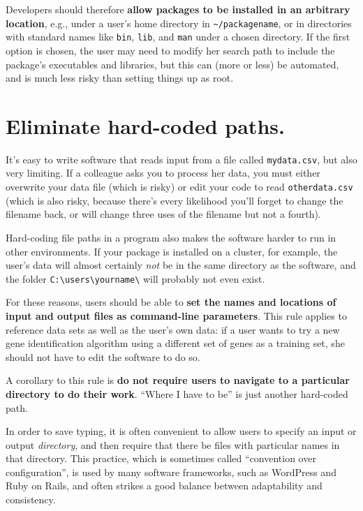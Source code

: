 \documentclass[10pt,letterpaper]{article}
\begin{document}
Developers should therefore
\textbf{allow packages to be installed in an arbitrary location},
e.g., under a user's home directory in
\texttt{\textasciitilde{}/packagename}, or in directories with standard
names like \texttt{bin}, \texttt{lib}, and \texttt{man} under a chosen
directory. If the first option is chosen, the user may need to modify
her search path to include the package's executables and libraries, but
this can (more or less) be automated, and is much less risky than
setting things up as root.

\section{Eliminate hard-coded paths.}

It's easy to write software that reads input from a file called
\texttt{mydata.csv}, but also very limiting. If a colleague asks you to
process her data, you must either overwrite your data file (which is
risky) or edit your code to read \texttt{otherdata.csv} (which is also
risky, because there's every likelihood you'll forget to change the
filename back, or will change three uses of the filename but not a
fourth).

Hard-coding file paths in a program also makes the software harder to run
in other environments. If your package is installed on a cluster, for
example, the user's data will almost certainly \emph{not} be in the same
directory as the software, and the folder
\texttt{C:\textbackslash{}users\textbackslash{}yourname\textbackslash{}}
will probably not even exist.

For these reasons, users should be able to
\textbf{set the names and locations of input and output files as command-line parameters}.
This rule applies to reference data sets as well as the user's own
data: if a user wants to try a new gene identification algorithm using
a different set of genes as a training set, she should not have to
edit the software to do so.

A corollary to this rule is
\textbf{do not require users to navigate to a particular directory to do their work}.
``Where I have to be'' is just another hard-coded path.

In order to save typing, it is often convenient to allow users to
specify an input or output \emph{directory}, and then require that there
be files with particular names in that directory. This practice, which
is sometimes called ``convention over configuration'', is used by many
software frameworks, such as WordPress and Ruby on Rails, and often
strikes a good balance between adaptability and consistency.
\end{document}
